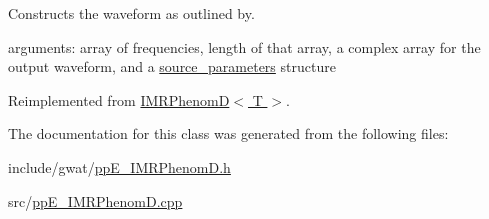 Constructs the waveform as outlined by. 

arguments\+: array of frequencies, length of that array, a complex array for the output waveform, and a \hyperlink{structsource__parameters}{source\+\_\+parameters} structure 

Reimplemented from \hyperlink{classIMRPhenomD_aa7192bf99437b49e0b4f27a342a79dae}{I\+M\+R\+Phenom\+D$<$ T $>$}.



The documentation for this class was generated from the following files\+:\begin{DoxyCompactItemize}
\item 
include/gwat/\hyperlink{ppE__IMRPhenomD_8h}{pp\+E\+\_\+\+I\+M\+R\+Phenom\+D.\+h}\item 
src/\hyperlink{ppE__IMRPhenomD_8cpp}{pp\+E\+\_\+\+I\+M\+R\+Phenom\+D.\+cpp}\end{DoxyCompactItemize}
